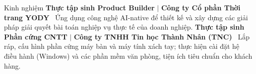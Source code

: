 \begin{rubric}{Kinh nghiệm}
%
    \textbf{Thực tập sinh Product Builder} $|$ \textbf{Công ty Cổ phần Thời trang YODY}
    \newline\textbullet\ Ứng dụng công nghệ AI-native để thiết kế và xây dựng các giải pháp giải quyết bài toán nghiệp vụ thực tế của doanh nghiệp.
\entry*[07/2025 -- 09/2025]%
    \textbf{Thực tập sinh Phần cứng CNTT} $|$ \textbf{Công ty TNHH Tin học Thành Nhân (TNC)}
    \newline\textbullet\ Lắp ráp, cấu hình phần cứng máy bàn và máy tính xách tay; thực hiện cài đặt hệ điều hành (Windows) và các phần mềm văn phòng, tiện ích tiêu chuẩn cho khách hàng.
\end{rubric}
